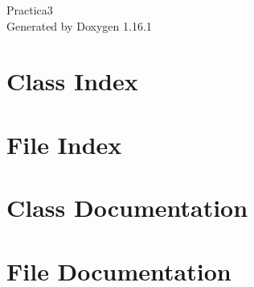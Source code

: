 \documentclass[twoside]{book}
\newcommand{\+}{\discretionary{\mbox{\scriptsize$\hookleftarrow$}}{}{}}
\newcommand{\clearemptydoublepage}{%
    \newpage{\pagestyle{empty}\cleardoublepage}%
  }
\begin{document}
  \raggedbottom
    \hypersetup{pageanchor=false,
                bookmarksnumbered=true,
                pdfencoding=unicode
               }
  \begin{titlepage}
  \vspace*{7cm}
  \begin{center}%
  {\Large Practica3}\\
  \vspace*{1cm}
  {\large Generated by Doxygen 1.16.1}\\
  \end{center}
  \end{titlepage}
  \clearemptydoublepage
  \tableofcontents
  \clearemptydoublepage
  \hypersetup{pageanchor=true}
\chapter{Class Index}

\chapter{File Index}

\chapter{Class Documentation}











\chapter{File Documentation}











  \backmatter
  \newpage
  \clearemptydoublepage
  \printindex
\end{document}
